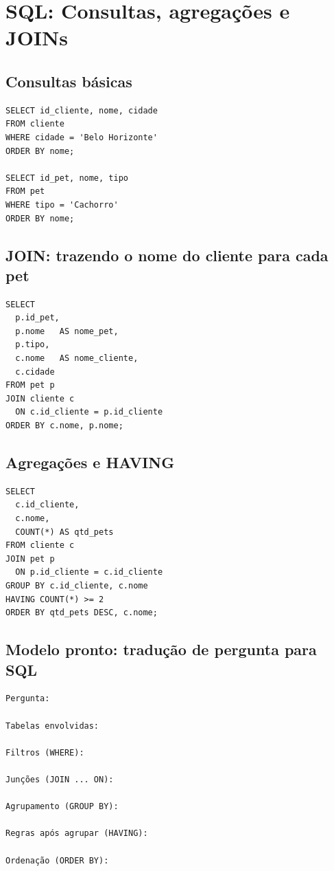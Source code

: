 \documentclass[12pt,a4paper]{article}
\begin{document}
\section{SQL: Consultas, agregações e JOINs}

\subsection{Consultas básicas}
\begin{lstlisting}[style=sql]
SELECT id_cliente, nome, cidade
FROM cliente
WHERE cidade = 'Belo Horizonte'
ORDER BY nome;

SELECT id_pet, nome, tipo
FROM pet
WHERE tipo = 'Cachorro'
ORDER BY nome;
\end{lstlisting}

\subsection{JOIN: trazendo o nome do cliente para cada pet}
\begin{lstlisting}[style=sql]
SELECT
  p.id_pet,
  p.nome   AS nome_pet,
  p.tipo,
  c.nome   AS nome_cliente,
  c.cidade
FROM pet p
JOIN cliente c
  ON c.id_cliente = p.id_cliente
ORDER BY c.nome, p.nome;
\end{lstlisting}

\subsection{Agregações e HAVING}
\begin{lstlisting}[style=sql]
SELECT
  c.id_cliente,
  c.nome,
  COUNT(*) AS qtd_pets
FROM cliente c
JOIN pet p
  ON p.id_cliente = c.id_cliente
GROUP BY c.id_cliente, c.nome
HAVING COUNT(*) >= 2
ORDER BY qtd_pets DESC, c.nome;
\end{lstlisting}

\subsection{Modelo pronto: tradução de pergunta para SQL}
\begin{lstlisting}[style=text]
Pergunta:

Tabelas envolvidas:

Filtros (WHERE):

Junções (JOIN ... ON):

Agrupamento (GROUP BY):

Regras após agrupar (HAVING):

Ordenação (ORDER BY):
\end{lstlisting}
\end{document}
